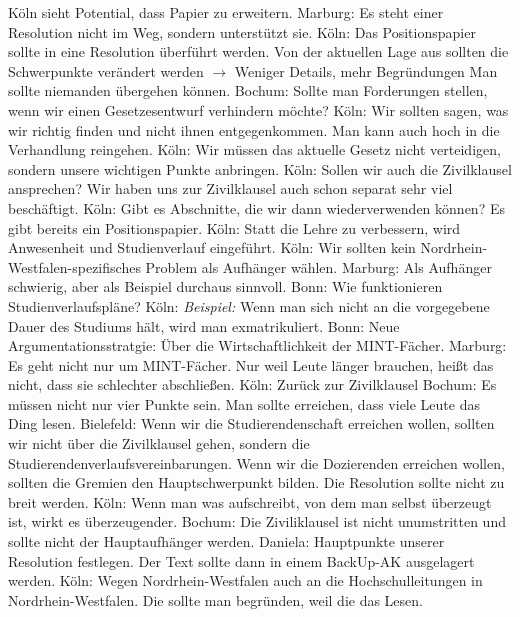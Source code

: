       \begin{outline}
        \1 Köln sieht Potential, dass Papier zu erweitern.
        \1 Marburg: Es steht einer Resolution nicht im Weg, sondern unterstützt sie.
        \1 Köln: Das Positionspapier sollte in eine Resolution überführt werden. Von der aktuellen Lage aus sollten die Schwerpunkte verändert werden $\rightarrow$ Weniger Details, mehr Begründungen
        \1 Man sollte niemanden übergehen können.
        \1 Bochum: Sollte man Forderungen stellen, wenn wir einen Gesetzesentwurf verhindern möchte?
          \2 Köln: Wir sollten sagen, was wir richtig finden und nicht ihnen entgegenkommen. Man kann auch hoch in die Verhandlung reingehen.
          \2 Köln: Wir müssen das aktuelle Gesetz nicht verteidigen, sondern unsere wichtigen Punkte anbringen.
        \1 Köln: Sollen wir auch die Zivilklausel ansprechen?
          \2 Wir haben uns zur Zivilklausel auch schon separat sehr viel beschäftigt.
          \2 Köln: Gibt es Abschnitte, die wir dann wiederverwenden können?
          \2 Es gibt bereits ein Positionspapier.
        \1 Köln: Statt die Lehre zu verbessern, wird Anwesenheit und Studienverlauf eingeführt.
        \1 Köln: Wir sollten kein Nordrhein-Westfalen-spezifisches Problem als Aufhänger wählen.
        \1 Marburg: Als Aufhänger schwierig, aber als Beispiel durchaus sinnvoll.
        \1 Bonn: Wie funktionieren Studienverlaufspläne?
        \1 Köln: \textit{Beispiel:} Wenn man sich nicht an die vorgegebene Dauer des Studiums hält, wird man exmatrikuliert.
        \1 Bonn: Neue Argumentationsstratgie: Über die Wirtschaftlichkeit der MINT-Fächer.
        \1 Marburg: Es geht nicht nur um MINT-Fächer. Nur weil Leute länger brauchen, heißt das nicht, dass sie schlechter abschließen.
        \1 Köln: Zurück zur Zivilklausel
        \1 Bochum: Es müssen nicht nur vier Punkte sein. Man sollte erreichen, dass viele Leute das Ding lesen.
          \2 Bielefeld: Wenn wir die Studierendenschaft erreichen wollen, sollten wir nicht über die Zivilklausel gehen, sondern die Studierendenverlaufsvereinbarungen.
          \2 Wenn wir die Dozierenden erreichen wollen, sollten die Gremien den Hauptschwerpunkt bilden.
        \1 Die Resolution sollte nicht zu breit werden.
        \1 Köln: Wenn man was aufschreibt, von dem man selbst überzeugt ist, wirkt es überzeugender.
        \1 Bochum: Die Ziviliklausel ist nicht unumstritten und sollte nicht der Hauptaufhänger werden.
        \1 Daniela: Hauptpunkte unserer Resolution festlegen. Der Text sollte dann in einem BackUp-AK ausgelagert werden.
          \2 Köln: Wegen Nordrhein-Westfalen auch an die Hochschulleitungen in Nordrhein-Westfalen. Die sollte man begründen, weil die das Lesen.

\end{outline}
